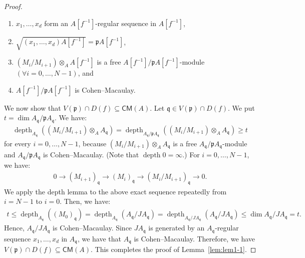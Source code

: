 \documentclass[a4paper, 11pt]{amsart}
\theoremstyle{definition}
\newcommand{\depth}{\operatorname{depth}}
\let\subset\subseteq
\begin{document}
\begin{proof}
    \begin{enumerate}
        \item $x_1, \ldots, x_d$ form an $A[f^{-1}]$-regular sequence in $A[f^{-1}]$,
        \item $\sqrt{(x_1, \ldots, x_d)A[f^{-1}]} = \mathfrak{p}A[f^{-1}]$,
        \item $(M_i/M_{i+1}) \otimes_A A[f^{-1}]$ is a free $A[f^{-1}]/\mathfrak{p}A[f^{-1}]$-module $(\forall i = 0, \ldots, N-1)$, and 
        \item $A[f^{-1}]/\mathfrak{p}A[f^{-1}]$ is Cohen--Macaulay. 
    \end{enumerate}

    We now show that $V(\mathfrak{p}) \cap D(f) \subset \mathsf{CM}(A)$. Let $\mathfrak{q} \in V(\mathfrak{p}) \cap D(f)$. We put $t = \dim A_\mathfrak{q}/\mathfrak{p}A_\mathfrak{q}$. We have:
    \begin{align*}
        \depth_{A_\mathfrak{q}}((M_i/M_{i+1}) \otimes_A A_\mathfrak{q}) = \depth_{A_\mathfrak{q}/\mathfrak{p}A_\mathfrak{q}}((M_i/M_{i+1}) \otimes_A A_\mathfrak{q}) \geq t
    \end{align*}
    for every $i = 0, \ldots, N-1$, because $(M_i/M_{i+1}) \otimes_A A_\mathfrak{q}$ is a free $A_\mathfrak{q}/\mathfrak{p}A_\mathfrak{q}$-module and $A_\mathfrak{q}/\mathfrak{p}A_\mathfrak{q}$ is Cohen--Macaulay. (Note that $\depth 0 = \infty$.) For $i = 0, \ldots, N-1$, we have:
    \begin{align*}
        0 \to (M_{i+1})_\mathfrak{q} \to (M_i)_\mathfrak{q} \to (M_i/M_{i+1})_\mathfrak{q} \to 0. 
    \end{align*}
    We apply the depth lemma \cite[\href{https://stacks.math.columbia.edu/tag/00LX}{Tag 00LX}]{stacks-project} to the above exact sequence repeatedly from $i = N-1$ to $i = 0$. Then, we have:
    \begin{align*}
        t \leq \depth_{A_\mathfrak{q}}((M_0)_\mathfrak{q}) = \depth_{A_\mathfrak{q}}(A_\mathfrak{q}/JA_\mathfrak{q}) = \depth_{A_\mathfrak{q}/JA_\mathfrak{q}}(A_\mathfrak{q}/JA_\mathfrak{q}) \leq \dim A_\mathfrak{q}/JA_\mathfrak{q} = t.
    \end{align*}
    Hence, $A_\mathfrak{q}/JA_\mathfrak{q}$ is Cohen--Macaulay. Since $JA_\mathfrak{q}$ is generated by an $A_\mathfrak{q}$-regular sequence $x_1, \ldots, x_d$ in $A_\mathfrak{q}$, we have that $A_\mathfrak{q}$ is Cohen--Macaulay. Therefore, we have $V(\mathfrak{p}) \cap D(f) \subset \mathsf{CM}(A)$. This completes the proof of Lemma~\ref{lem:lem1-1}.
\end{proof}
\end{document}
